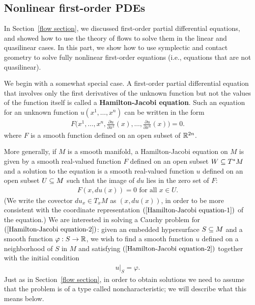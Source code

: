 \subsection{Nonlinear first-order PDEs}
In Section~\ref{flow section}, we discussed first-order partial differential equations, and showed how to use the theory of flows to solve them in the linear and quasilinear cases. In this part, we show how to use symplectic and contact geometry to solve fully nonlinear first-order equations (i.e., equations that are not quasilinear).\par
We begin with a somewhat special case. A first-order partial differential equation that involves only the first derivatives of the unknown function but not the values of the function itself is called a \textbf{Hamilton-Jacobi equation}. Such an equation for an unknown function $u(x^1,\dots,x^n)$ can be written in the form
\begin{align}\label{Hamilton-Jacobi equation-1}
F\Big(x^1,\dots,x^n,\frac{\partial u}{\partial x^1}(x),\dots,\frac{\partial u}{\partial x^n}(x))=0.
\end{align}
where $F$ is a smooth function defined on an open subset of $\mathbb{R}^{2n}$.\par
More generally, if $M$ is a smooth manifold, a Hamilton-Jacobi equation on $M$ is given by a smooth real-valued function $F$ defined on an open subset $W\subseteq T^*M$ and a solution to the equation is a smooth real-valued function $u$ defined on an open subset $U\subseteq M$ such that the image of $du$ lies in the zero set of $F$:
\begin{align}\label{Hamilton-Jacobi equation-2}
F(x,du(x))=0\text{ for all }x\in U.
\end{align}
(We write the covector $du_x\in T_xM$ as $(x,du(x))$, in order to be more consistent with the coordinate representation $(\ref{Hamilton-Jacobi equation-1})$ of the equation.) We are interested in solving a Cauchy problem for $(\ref{Hamilton-Jacobi equation-2})$: given an embedded hypersurface $S\subseteq M$ and a smooth function $\varphi:S\to\mathbb{R}$, we wish to find a smooth function $u$ defined on a neighborhood of $S$ in $M$ and satisfying $(\ref{Hamilton-Jacobi equation-2})$ together with the initial condition
\begin{align}\label{Hamilton-Jacobi equation boundary}
u|_S=\varphi.
\end{align}
Just as in Section~\ref{flow section}, in order to obtain solutions we need to assume that the problem is of a type called noncharacteristic; we will describe what this means below.\par
